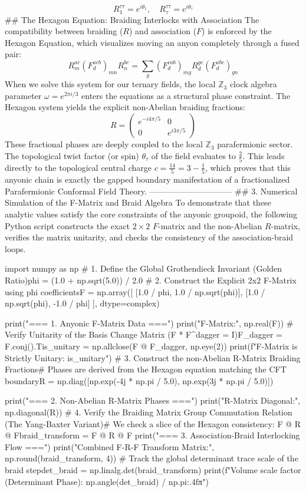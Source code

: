 $$R^{\tau\tau}_1 = e^{i \theta_1}, \quad R^{\tau\tau}_\tau = e^{i \theta_\tau}$$ 
## The Hexagon Equation: Braiding Interlocks with Association
The compatibility between braiding ($R$) and association ($F$) is enforced by the Hexagon Equation, which visualizes moving an anyon completely through a fused pair:
$$R^{ac}_m (F^{acb}_d)_{mn} R^{bc}_n = \sum_{g} (F^{cab}_d)_{mg} R^{gc}_d (F^{abc}_d)_{gn}$$ 
When we solve this system for our ternary fields, the local $\mathbb{Z}_3$ clock algebra parameter $\omega = e^{2\pi i / 3}$ enters the equations as a structural phase constraint. The Hexagon system yields the explicit non-Abelian braiding fractions:
$$R = \begin{pmatrix} e^{-i 4\pi/5} & 0 \\ 0 & e^{i 3\pi/5} \end{pmatrix}$$ 
These fractional phases are deeply coupled to the local $\mathbb{Z}_3$ parafermionic sector. The topological twist factor (or spin) $\theta_\tau$ of the field evaluates to $\frac{2}{5}$.
This leads directly to the topological central charge $c = \frac{14}{5} = 3 - \frac{1}{5}$, which proves that this anyonic chain is exactly the gapped boundary manifestation of a fractionalized Parafermionic Conformal Field Theory.
------------------------------
## 3. Numerical Simulation of the F-Matrix and Braid Algebra
To demonstrate that these analytic values satisfy the core constraints of the anyonic groupoid, the following Python script constructs the exact $2 \times 2$ $F$-matrix and the non-Abelian $R$-matrix, verifies the matrix unitarity, and checks the consistency of the association-braid loops.

import numpy as np
# 1. Define the Global Grothendieck Invariant (Golden Ratio)phi = (1.0 + np.sqrt(5.0)) / 2.0
# 2. Construct the Explicit 2x2 F-Matrix using phi coefficientsF = np.array([
    [1.0 / phi, 1.0 / np.sqrt(phi)],
    [1.0 / np.sqrt(phi), -1.0 / phi]
], dtype=complex)

print("=== 1. Anyonic F-Matrix Data ===")
print("F-Matrix:\n", np.real(F))
# Verify Unitarity of the Basis Change Matrix (F * F^dagger = I)F_dagger = F.conj().Tis_unitary = np.allclose(F @ F_dagger, np.eye(2))
print(f"F-Matrix is Strictly Unitary: {is_unitary}")
# 3. Construct the non-Abelian R-Matrix Braiding Fractions# Phases are derived from the Hexagon equation matching the CFT boundaryR = np.diag([np.exp(-4j * np.pi / 5.0), np.exp(3j * np.pi / 5.0)])

print("\n=== 2. Non-Abelian R-Matrix Phases ===")
print("R-Matrix Diagonal:\n", np.diagonal(R))
# 4. Verify the Braiding Matrix Group Commutation Relation (The Yang-Baxter Variant)# We check a slice of the Hexagon consistency: F @ R @ Fbraid_transform = F @ R @ F
print("\n=== 3. Association-Braid Interlocking Flow ===")
print("Combined F-R-F Transform Matrix:\n", np.round(braid_transform, 4))
# Track the global determinant trace scale of the braid stepdet_braid = np.linalg.det(braid_transform)
print(f"Volume scale factor (Determinant Phase): {np.angle(det_braid) / np.pi:.4f}π")

